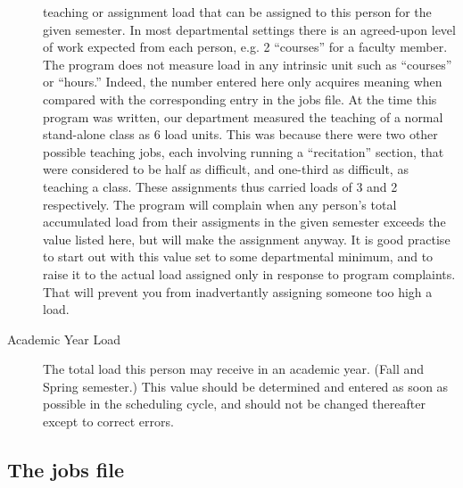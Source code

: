 \begin{description}
teaching or assignment load that can be assigned to this person for the
given semester. In most departmental settings there is an agreed-upon level
of work expected from each person, e.g. 2 ``courses'' for a faculty member.
The program does not measure load in any intrinsic unit such as ``courses''
or ``hours.'' Indeed, the number entered here only acquires meaning when
compared with the corresponding entry in the jobs file. At the time
this program was written, our department measured the teaching of a normal
stand-alone class as 6 load units. This was because there were two 
other possible teaching jobs, each involving running a ``recitation'' section,
that were considered to be half as difficult, and one-third as difficult, as
teaching a class. These assignments thus carried loads of 3 and 2 
respectively. The program will complain when any person's total accumulated
load from their assigments in the given semester exceeds the value listed
here, but will make the assignment anyway. It is good practise to start
out with this value set to some departmental minimum, and to raise it to
the actual load assigned only in response to program complaints. That will
prevent you from inadvertantly assigning someone too high a load. 
\item [Academic Year Load] The total load this person may receive in an
academic year. (Fall and Spring semester.) This value should be determined and
entered as soon as possible in the scheduling cycle, and should not be
changed thereafter except to correct errors. 
\end{description}

\subsection{The jobs file} 

